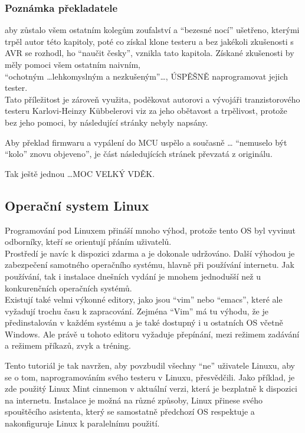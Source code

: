 \subsubsection{Poznámka překladatele}
\label{linux}
aby zůstalo všem ostatním kolegům zoufalství a "`bezesné nocí"' ušetřeno, kterými trpěl autor této kapitoly, poté co získal klone testeru a bez jakékoli zkušenosti s AVR se rozhodl, ho "`naučit česky"', vznikla tato kapitola. Získané zkušenosti by měly pomoci všem ostatním naivním,\\ "`ochotným \dots lehkomyslným a nezkušeným"'\dots, ÚSPĚŠNĚ naprogramovat jejich tester.
\\
Tato příležitost je zároveň využita, poděkovat autorovi a vývojáři tranzistorového testeru
Karlovi-Heinzy Kübbelerovi viz \cite{karlheinz1} za jeho obětavost a trpělivost, protože bez jeho pomoci, by následující stránky nebyly napsány.
     
Aby překlad firmwaru a vypálení do MCU uspělo a současně \dots
"`nemuselo být "`kolo"' znovu objeveno"', je část následujících stránek převzatá z originálu.

Tak ještě jednou \dots \huge{MOC VELKÝ VDĚK}.
\normalsize
\subsection{Operační system Linux}
Programování pod Linuxem přináší mnoho výhod, protože tento OS byl vyvinut odborníky, kteří se orientují  přáním uživatelů.\\
Prostředí je navíc k dispozici zdarma a je dokonale udržováno.
Další výhodou je zabezpečení samotného operačního systému, hlavně při používání internetu.
Jak používání, tak i instalace dnešních vydání je mnohem jednodušší než u konkurenčních operačních systémů.\\
Existují také velmi výkonné editory, jako jsou "`vim"' nebo "`emacs"', které ale vyžadují trochu času k zapracování. Zejména "`Vim"' má tu výhodu, že
je předinstalován v každém systému a je také dostupný i u ostatních OS včetně Windows. Ale právě u tohoto editoru vyžaduje přepínání, mezi režimem zadávání a režimem příkazů, zvyk a tréning. 

Tento tutoriál je tak navržen, aby povzbudil všechny "`ne"' uživatele Linuxu, aby se o tom, naprogramováním svého testeru v Linuxu, přesvědčili.
Jako příklad, je zde použitý Linux Mint cinnemon v aktuální verzi, která je bezplatně k dispozici na internetu.  
Instalace je možná na různé způsoby, Linux přinese svého spouštěcího asistenta, který se samostatně předchozí OS respektuje a nakonfiguruje
Linux k paralelnímu použití.
\vspace*{-0.3cm} 
